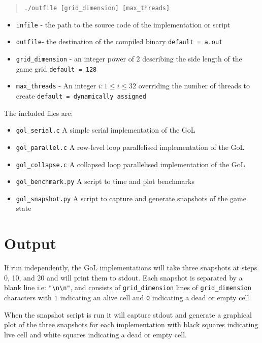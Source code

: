 \documentclass[]{article}
\begin{document}
\begin{quote}
\texttt{./outfile [grid\_dimension] [max\_threads]}
\end{quote}

\begin{itemize}[label={}]
\item \texttt{infile} - the path to the source code of the implementation or script
\item \texttt{outfile}- the destination of the compiled binary \texttt{default = a.out}
\item \texttt{grid\_dimension} - an integer power of 2 describing the side length of the game grid \texttt{default = 128}
\item \texttt{max\_threads} - An integer $i : 1 \leq i \leq 32$ overriding the number of threads to create \texttt{default = dynamically assigned}
\end{itemize}

\noindent The included files are:
\begin{itemize}[label={}]
\item \texttt{gol\_serial.c} A simple serial implementation of the GoL

\item \texttt{gol\_parallel.c} A row-level loop parallelised implementation of the GoL

\item \texttt{gol\_collapse.c} A collapsed loop parallelised implementation of the GoL

\item \texttt{gol\_benchmark.py} A script to time and plot benchmarks

\item \texttt{gol\_snapshot.py} A script to capture and generate snapshots of the game state
\end{itemize}

\section{Output}
If run independently, the GoL implementations will take three snapshots at steps 0, 10, and 20 and will print them to stdout. Each snapshot is separated by a blank line i.e: \texttt{"\textbackslash n\textbackslash n"}, and consists of \texttt{grid\_dimension} lines of \texttt{grid\_dimension} characters with \texttt{1} indicating an alive cell and \texttt{0} indicating a dead or empty cell.

When the snapshot script is run it will capture stdout and generate a graphical plot of the three snapshots for each implementation with black squares indicating live cell and white squares indicating a dead or empty cell.
\end{document}
